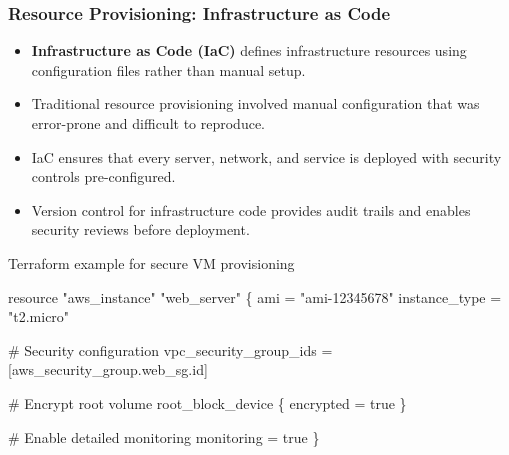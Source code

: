\documentclass{beamer}
\begin{document}
\begin{frame}[fragile]
  \frametitle{Resource Provisioning: Infrastructure as Code}
  
  \begin{itemize}
    \item \textbf{Infrastructure as Code (IaC)} defines infrastructure resources using configuration files rather than manual setup.
    \item Traditional resource provisioning involved manual configuration that was error-prone and difficult to reproduce.
    \item IaC ensures that every server, network, and service is deployed with security controls pre-configured.
    \item Version control for infrastructure code provides audit trails and enables security reviews before deployment.
  \end{itemize}
  
  \begin{block}{Terraform example for secure VM provisioning}
    \tiny
    \begin{semiverbatim}
resource "aws_instance" "web_server" \{
  ami           = "ami-12345678"
  instance_type = "t2.micro"
  
  # Security configuration
  vpc_security_group_ids = [aws_security_group.web_sg.id]
  
  # Encrypt root volume
  root_block_device \{
    encrypted = true
  \}
  
  # Enable detailed monitoring
  monitoring = true
\}
    \end{semiverbatim}
  \end{block}
\end{frame}
\end{document}
